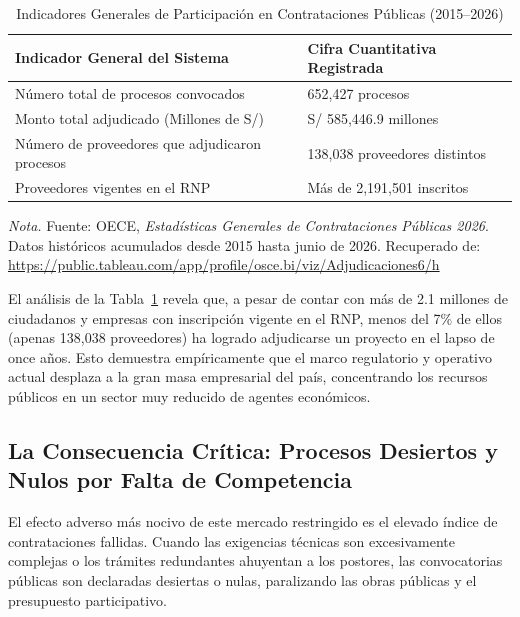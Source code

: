 \documentclass[12pt,a4paper]{article}
\begin{document}
\begin{table}[htbp]
\caption{Indicadores Generales de Participación en Contrataciones Públicas (2015--2026)}
\label{tab:indicadores}
\centering
\begin{tabular}{ll}
\toprule
\textbf{Indicador General del Sistema} & \textbf{Cifra Cuantitativa Registrada} \\
\midrule
Número total de procesos convocados & 652,427 procesos \\
Monto total adjudicado (Millones de S/) & S/ 585,446.9 millones \\
Número de proveedores que adjudicaron procesos & 138,038 proveedores distintos \\
Proveedores vigentes en el RNP & Más de 2,191,501 inscritos \\
\bottomrule
\end{tabular}
\vspace{0.2cm}
\begin{flushleft}
\small \textit{Nota.} Fuente: OECE, \textit{Estadísticas Generales de Contrataciones Públicas 2026}. Datos históricos acumulados desde 2015 hasta junio de 2026. Recuperado de: \url{https://public.tableau.com/app/profile/osce.bi/viz/Adjudicaciones6/h}
\end{flushleft}
\end{table}

El análisis de la Tabla~\ref{tab:indicadores} revela que, a pesar de contar con más de 2.1 millones de ciudadanos y empresas con inscripción vigente en el RNP, menos del 7\% de ellos (apenas 138,038 proveedores) ha logrado adjudicarse un proyecto en el lapso de once años. Esto demuestra empíricamente que el marco regulatorio y operativo actual desplaza a la gran masa empresarial del país, concentrando los recursos públicos en un sector muy reducido de agentes económicos.

\subsection{La Consecuencia Crítica: Procesos Desiertos y Nulos por Falta de Competencia}
El efecto adverso más nocivo de este mercado restringido es el elevado índice de contrataciones fallidas. Cuando las exigencias técnicas son excesivamente complejas o los trámites redundantes ahuyentan a los postores, las convocatorias públicas son declaradas desiertas o nulas, paralizando las obras públicas y el presupuesto participativo.
\end{document}
